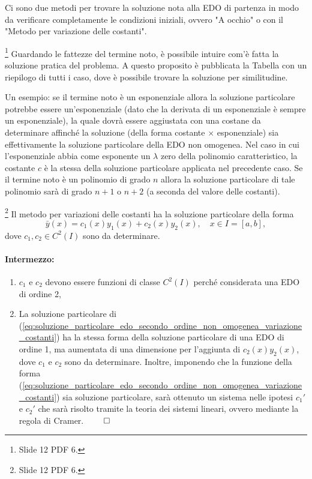 Ci sono due metodi per trovare la soluzione nota alla EDO di partenza in modo da verificare completamente le condizioni iniziali, ovvero "A occhio" o con il "Metodo per variazione delle costanti".

\label{ssec:metodo_somiglianza}
\footnote{Slide 12 PDF 6.}
Guardando le fattezze del termine noto, è possibile intuire com'è fatta la soluzione pratica del problema. A questo proposito è pubblicata la Tabella con un riepilogo di tutti i caso, dove è possibile trovare la soluzione per similitudine.

\noindent Un esempio: se il termine noto è un esponenziale allora la soluzione particolare potrebbe essere un'esponenziale (dato che la derivata di un esponenziale è sempre un esponenziale), la quale dovrà essere aggiustata con una costane da determinare affinché la soluzione (della forma costante $\times$ esponenziale) sia effettivamente la soluzione particolare della EDO non omogenea. Nel caso in cui l'esponenziale abbia come esponente un $\lambda$ zero della polinomio caratteristico, la costante $c$ è la stessa della soluzione particolare applicata nel precedente caso. Se il termine noto è un polinomio di grado $n$ allora la soluzione particolare di tale polinomio sarà di grado $n+1$ o $n+2$ (a seconda del valore delle costanti).

\label{ssec:variazione_costanti}
\footnote{Slide 12 PDF 6.}
Il metodo per variazioni delle costanti ha la soluzione particolare della forma
\begin{equation}\label{eq:soluzione_particolare_edo_secondo_ordine_non_omogenea_variazione_costanti}
	\bar{y}(x) = c_1(x) y_1(x) + c_2(x) y_2(x),\quad x\in I=[a,b],
\end{equation}
dove $c_1,c_2\in C^2(I)$ sono da determinare.

\paragraph{Intermezzo:}
\begin{enumerate}
	\item $c_1$ e $c_2$ devono essere funzioni di classe $C^2(I)$ perché considerata una EDO di ordine 2,
	\item La soluzione particolare di (\ref{eq:soluzione_particolare_edo_secondo_ordine_non_omogenea_variazione_costanti}) ha la stessa forma della soluzione particolare di una EDO di ordine 1, ma aumentata di una dimensione per l'aggiunta di $c_2(x) y_2(x)$, dove $c_1$ e $c_2$ sono da determinare. Inoltre, imponendo che la funzione della forma (\ref{eq:soluzione_particolare_edo_secondo_ordine_non_omogenea_variazione_costanti}) sia soluzione particolare, sarà ottenuto un sistema nelle ipotesi $c_1'$ e $c_2'$ che sarà risolto tramite la teoria dei sistemi lineari, ovvero mediante la regola di Cramer. $\qed$
\end{enumerate}

